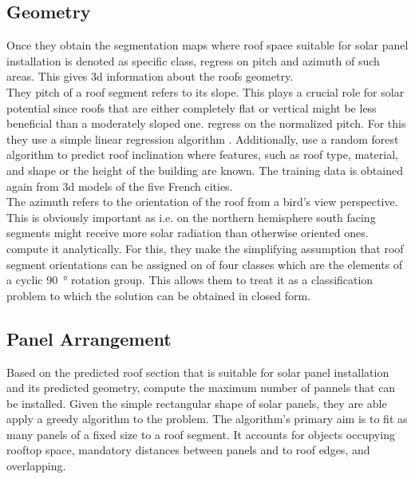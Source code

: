 \documentclass{article} %
\begin{document}
\subsection*{Geometry}
Once they obtain the segmentation maps where roof space suitable for solar panel installation is denoted as specific class, \citet{de2021predicting} regress on pitch and azimuth of such areas. This gives 3d information about the roofs geometry.\\
They pitch of a roof segment refers to its slope. This plays a crucial role for solar potential since roofs that are either completely flat or vertical might be less beneficial than a moderately sloped one. \citet{de2021predicting} regress on the normalized pitch. For this they use a simple linear regression algorithm \cite{gross2003linear}. Additionally,\citet{de2021predicting} use a random forest algorithm \cite{belgiu2016random} to predict roof inclination where features, such as roof type, material, and shape or the height of the building are known. The training data is obtained again from 3d models of the five French cities. \\
The azimuth refers to the orientation of the roof from a bird's view perspective. This is obviously important as i.e. on the northern hemisphere south facing segments might receive more solar radiation than otherwise oriented ones.\\ \citet{de2021predicting} compute it analytically. For this, they make the simplifying assumption that roof segment orientations can be assigned on of four classes which are the elements of a cyclic \SI{90}{\degree} rotation group. This allows them to treat it as a classification problem to which the solution can be obtained in closed form.

\subsection*{Panel Arrangement}
Based on the predicted roof section that is suitable for solar panel installation and its predicted geometry, \citet{de2021predicting} compute the maximum number of pannels that can be installed. Given the simple rectangular shape of solar panels, they are able apply a greedy algorithm to the problem. The algorithm's primary aim is to fit as many panels of a fixed size to a roof segment. It accounts for objects occupying rooftop space, mandatory distances between panels and to roof edges, and overlapping.
\end{document}

